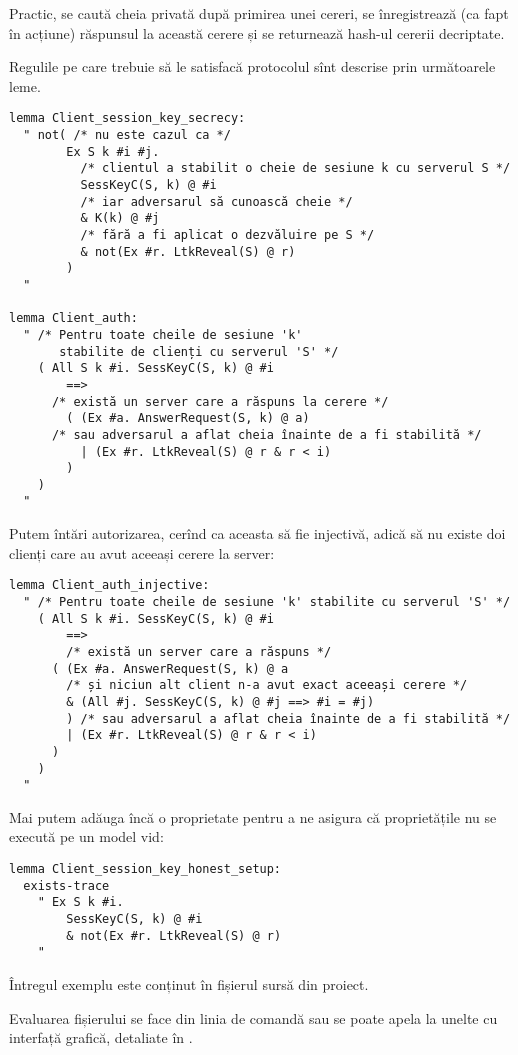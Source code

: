 Practic, se caută cheia privată după primirea unei cereri, se înregistrează
(ca fapt în acțiune) răspunsul la această cerere și se returnează hash-ul
cererii decriptate.

Regulile pe care trebuie să le satisfacă protocolul sînt descrise prin
următoarele leme.

\begin{verbatim}
lemma Client_session_key_secrecy:
  " not( /* nu este cazul ca */
        Ex S k #i #j.
          /* clientul a stabilit o cheie de sesiune k cu serverul S */
          SessKeyC(S, k) @ #i
          /* iar adversarul să cunoască cheie */
          & K(k) @ #j
          /* fără a fi aplicat o dezvăluire pe S */
          & not(Ex #r. LtkReveal(S) @ r)
        )
  "

lemma Client_auth:
  " /* Pentru toate cheile de sesiune 'k'
       stabilite de clienți cu serverul 'S' */
    ( All S k #i. SessKeyC(S, k) @ #i
        ==>
      /* există un server care a răspuns la cerere */
        ( (Ex #a. AnswerRequest(S, k) @ a)
      /* sau adversarul a aflat cheia înainte de a fi stabilită */
          | (Ex #r. LtkReveal(S) @ r & r < i)
        )
    )
  "
\end{verbatim}

Putem întări autorizarea, cerînd ca aceasta să fie injectivă, adică să
nu existe doi clienți care au avut aceeași cerere la server:

\begin{verbatim}
lemma Client_auth_injective:
  " /* Pentru toate cheile de sesiune 'k' stabilite cu serverul 'S' */
    ( All S k #i. SessKeyC(S, k) @ #i
        ==>
        /* există un server care a răspuns */
      ( (Ex #a. AnswerRequest(S, k) @ a
        /* și niciun alt client n-a avut exact aceeași cerere */
        & (All #j. SessKeyC(S, k) @ #j ==> #i = #j)
        ) /* sau adversarul a aflat cheia înainte de a fi stabilită */
        | (Ex #r. LtkReveal(S) @ r & r < i)
      )
    )
  "
\end{verbatim}

Mai putem adăuga încă o proprietate pentru a ne asigura că proprietățile
nu se execută pe un model vid:
\begin{verbatim}
lemma Client_session_key_honest_setup:
  exists-trace
    " Ex S k #i.
        SessKeyC(S, k) @ #i
        & not(Ex #r. LtkReveal(S) @ r)
    "
\end{verbatim}

Întregul exemplu este conținut în fișierul sursă din proiect.

Evaluarea fișierului se face din linia de comandă sau se poate apela la
unelte cu interfață grafică, detaliate în \cite[pp.\ 20--26]{taman}.

